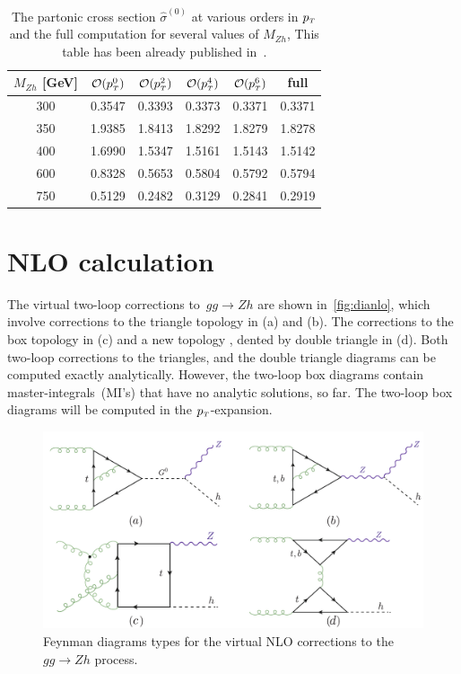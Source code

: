 \begin{table}
	\renewcommand{\arraystretch}{1.2}
	\centering
	\begin{tabular}{| c| c | c | c| c| c|} \hline
		\rowcolor{lightgray}  $M_{Zh}$ [GeV]  & $\mathcal{O}(p_{\scriptscriptstyle T}^0)$ & $\mathcal{O}(p_{\scriptscriptstyle T}^2)$ & $\mathcal{O}(p_{\scriptscriptstyle T}^4)$ & $\mathcal{O}(p_{\scriptscriptstyle T}^6)$ & full \\ \hline 
		\cellcolor{lightgray} 300 & 0.3547 & 0.3393 &  0.3373 &0.3371& 0.3371 \\
		\cellcolor{lightgray} 350 & 1.9385 & 1.8413& 1.8292 &1.8279& 1.8278 \\
		\cellcolor{lightgray} 400 & 1.6990 & 1.5347 & 1.5161 &1.5143& 1.5142 \\
		\cellcolor{lightgray} 600 & 0.8328 & 0.5653 & 0.5804 &0.5792&  0.5794 \\ 
		\cellcolor{lightgray} 750 & 0.5129 & 0.2482 & 0.3129 & 0.2841 &  0.2919 \\ \hline
	\end{tabular}
	\caption{The partonic cross section $\hat{\sigma}^{(0)}$ at
		various orders in $p_{\scriptscriptstyle T}$ and the full computation for several values of $M_{Zh}$, This table has been already published in~\cite{Alasfar:2021ppe}. \label{tab:partonic}}
\end{table}
\section{ NLO calculation }
\label{sec:quattro}
The virtual two-loop corrections to~$ gg\to Zh$ are shown in~\autoref{fig:dianlo}, which involve corrections to the triangle topology in (a) and (b). The corrections to the box topology in (c) and a new topology , dented by double triangle in (d). Both two-loop corrections to the triangles, and the double triangle diagrams can be computed exactly analytically. However, the two-loop box diagrams contain master-integrals~(MI's) that have no analytic solutions, so far. The two-loop box diagrams will be computed in the $p_{\scriptscriptstyle T}$-expansion.
\begin{figure}[htpb!]
	\begin{center}
		\includegraphics[width=12cm]{./figures/Feynman_NL0}
		\caption{Feynman diagrams types for the virtual NLO corrections to the $gg \to Zh$ process. }
		\label{fig:dianlo}
	\end{center}
\end{figure}
